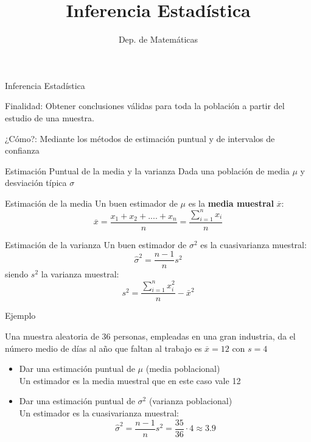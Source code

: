 \documentclass[11pt,handout]{beamer}
\title{Inferencia Estadística}
\date{}
\author{Dep. de Matemáticas}
\begin{document}
\begin{frame}
\titlepage
\end{frame}


\begin{frame}{Inferencia Estadística}
\begin{block}{Finalidad:} Obtener conclusiones válidas para toda la población a partir del estudio de una muestra.
\end{block}

\pause

\begin{block}{¿Cómo?:} Mediante los métodos de estimación puntual y de intervalos de confianza
\end{block}


\end{frame}

\begin{frame}{Estimación Puntual de la media y la varianza}
Dada una población de media $\mu$ y desviación típica $\sigma$
\begin{block}{Estimación de la media}
 Un buen estimador de $\mu$ es la \textbf{media muestral} $\overline{x}$:
$$\overline{x}= \frac{x_1 + x_2 + ....+x_n} {n}=\frac{{\sum_{i=1}^n x_i }}{n}$$
\end{block}
\pause
\begin{block}{Estimación de la varianza}
Un buen estimador de $\sigma^2$ es la cuasivarianza muestral:
$$\widehat{\sigma}^2=\frac{n-1}{n}s^2$$
siendo $s^2$ la varianza muestral:
$$s^2=\frac{\sum_{i=1}^n x_i^2 }{n} - \bar x^2$$
\end{block}
\end{frame}

\begin{frame}{Ejemplo}
\begin{block}{}
Una muestra aleatoria de 36 personas, empleadas en una gran industria, da el número medio de días al año que faltan al trabajo es $\overline{x} = 12$ con $s = 4$
\end{block}

\begin{itemize}[<+->]
    \item Dar una estimación puntual de $\mu$ (media poblacional)
    \pause 
    \\ Un estimador es la media muestral que en este caso vale 12
    \item Dar una estimación puntual de $\sigma^2$ (varianza poblacional)
    \pause 
    \\ Un estimador es la cuasivarianza muestral:
    $$\widehat{\sigma}^2=\frac{n-1}{n}s^2=\frac{35}{36}\cdot 4\approx 3.9$$
\end{itemize}

\end{frame}
\end{document}
